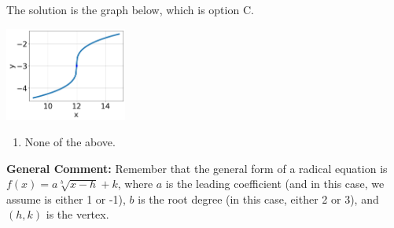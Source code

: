 \documentclass{extbook}[14pt]
\begin{document}
\begin{enumerate}
{The solution is the graph below, which is option C.
\begin{center}
    \includegraphics[width=0.3\textwidth]{../Figures/radicalEquationToGraphCopyCC.png}
\end{center}\begin{enumerate}[label=\Alph*.]
\item None of the above.\end{enumerate}
\textbf{General Comment:} Remember that the general form of a radical equation is $ f(x) = a \sqrt[b]{x - h} + k $, where $a$ is the leading coefficient (and in this case, we assume is either 1 or -1), $b$ is the root degree (in this case, either 2 or 3), and $(h, k)$ is the vertex.
}
\end{enumerate}
\end{document}
